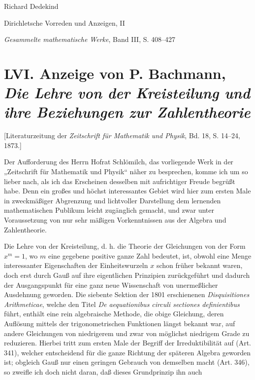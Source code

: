 \documentclass[11pt]{article}
\newcommand{\origpage}[1]{\par\vspace{0.25em}\noindent{\footnotesize\itshape [Gedruckte Seite #1]}\par\vspace{0.25em}}
\begin{document}
\begin{center}
{\Large Richard Dedekind}\par\vspace{0.3em}
{\large Dirichletsche Vorreden und Anzeigen, II}\par\vspace{0.2em}
{\normalsize \textit{Gesammelte mathematische Werke}, Band III, S. 408--427}\par
\end{center}
\vspace{0.7em}

\origpage{408}
\section*{LVI. Anzeige von P. Bachmann, \textit{Die Lehre von der Kreisteilung und ihre Beziehungen zur Zahlentheorie}}
\begin{center}\small [Literaturzeitung der \textit{Zeitschrift für Mathematik und Physik}, Bd. 18, S. 14--24, 1873.]\end{center}

Der Aufforderung des Herrn Hofrat Schlömilch, das vorliegende Werk in der „Zeitschrift für Mathematik und Physik“ näher zu besprechen, komme ich um so lieber nach, als ich das Erscheinen desselben mit aufrichtiger Freude begrüßt habe. Denn ein großes und höchst interessantes Gebiet wird hier zum ersten Male in zweckmäßiger Abgrenzung und lichtvoller Darstellung dem lernenden mathematischen Publikum leicht zugänglich gemacht, und zwar unter Voraussetzung von nur sehr mäßigen Vorkenntnissen aus der Algebra und Zahlentheorie.

Die Lehre von der Kreisteilung, d. h. die Theorie der Gleichungen von der Form $x^m=1$, wo $m$ eine gegebene positive ganze Zahl bedeutet, ist, obwohl eine Menge interessanter Eigenschaften der Einheitswurzeln $x$ schon früher bekannt waren, doch erst durch Gauß auf ihre eigentlichen Prinzipien zurückgeführt und dadurch der Ausgangspunkt für eine ganz neue Wissenschaft von unermeßlicher Ausdehnung geworden. Die siebente Sektion der 1801 erschienenen \textit{Disquisitiones Arithmeticae}, welche den Titel \textit{De aequationibus circuli sectiones definientibus} führt, enthält eine rein algebraische Methode, die obige Gleichung, deren Auflösung mittels der trigonometrischen Funktionen längst bekannt war, auf andere Gleichungen von niedrigerem und zwar von möglichst niedrigem Grade zu reduzieren. Hierbei tritt zum ersten Male der Begriff der Irreduktibilität auf (Art. 341), welcher entscheidend für die ganze Richtung der späteren Algebra geworden ist; obgleich Gauß nur einen geringen Gebrauch von demselben macht (Art. 346), so zweifle ich doch nicht daran, daß dieses Grundprinzip ihn auch
\end{document}
